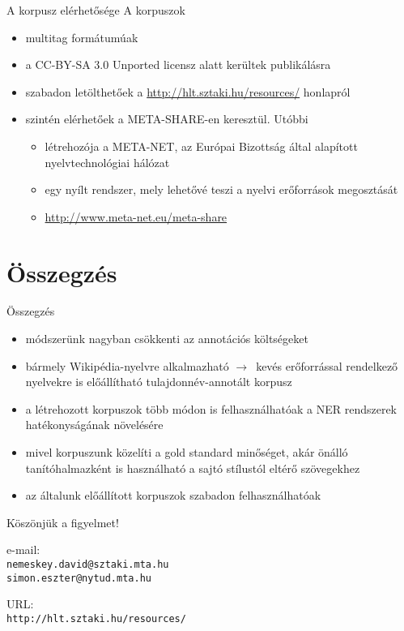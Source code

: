 \documentclass[utf8x,t]{beamer}
\newcommand{\vitem}{\item \vspace{4pt}}
\newcommand{\nyil}{$\rightarrow$\ }
\begin{document}
\begin{frame}{A korpusz elérhetősége}
\bigskip
A korpuszok
\begin{itemize}
\vitem multitag formátumúak
\vitem a CC-BY-SA 3.0 Unported licensz alatt kerültek publikálásra
\vitem szabadon letölthetőek a \url{http://hlt.sztaki.hu/resources/} honlapról
\vitem szintén elérhetőek a META-SHARE-en keresztül. Utóbbi
  \begin{itemize}
  \vitem létrehozója a META-NET, az Európai Bizottság által alapított nyelvtechnológiai hálózat
  \vitem egy nyílt rendszer, mely lehetővé teszi a nyelvi erőforrások megosztását
  \vitem \url{http://www.meta-net.eu/meta-share}
  \end{itemize}
\end{itemize}

\end{frame}

\section{Összegzés}
\begin{frame}{Összegzés}
  \begin{itemize}
  \vitem módszerünk nagyban csökkenti az annotációs költségeket 
  \vitem bármely Wikipédia-nyelvre alkalmazható \nyil kevés erőforrással rendelkező nyelvekre is előállítható tulajdonnév-annotált korpusz
  \vitem a létrehozott korpuszok több módon is felhasználhatóak a NER rendszerek hatékonyságának növelésére
  \vitem mivel korpuszunk közelíti a gold standard minőséget, akár önálló tanítóhalmazként is használható a sajtó stílustól eltérő szövegekhez
  \vitem az általunk előállított korpuszok szabadon felhasználhatóak
  \end{itemize}
  \vfill
\end{frame}

\begin{frame}

\bigskip

\bigskip

{\huge Köszönjük a figyelmet!}

\bigskip
\bigskip
\bigskip

e-mail: \\ {\tt nemeskey.david@sztaki.mta.hu \\ simon.eszter@nytud.mta.hu} \\

\bigskip
\bigskip

URL: \\ {\tt http://hlt.sztaki.hu/resources/}


\end{frame}
\end{document}
